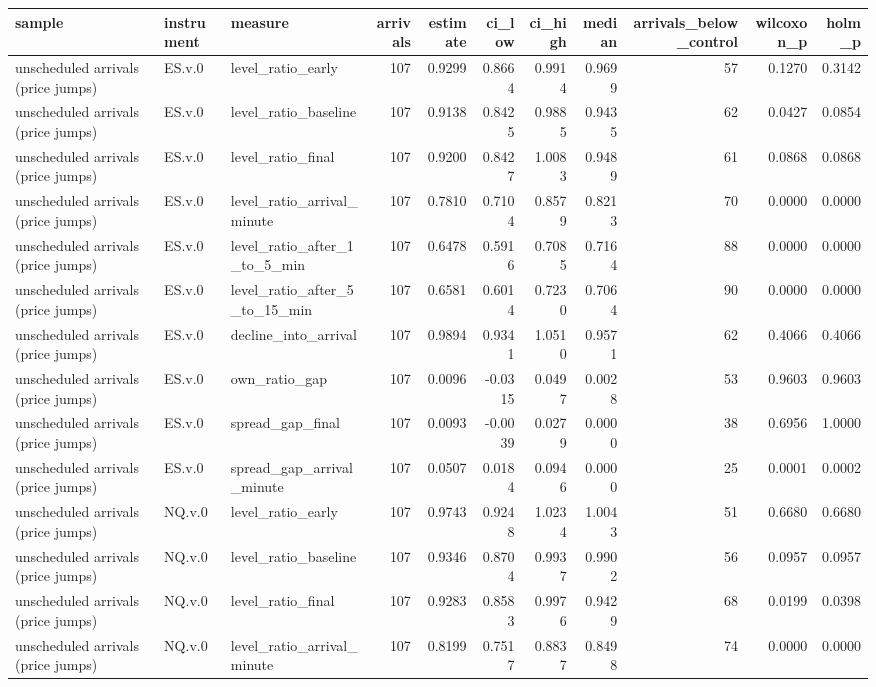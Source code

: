 \begin{tabular}{lllrrrrrrrr}
\toprule
sample & instrument & measure & arrivals & estimate & ci_low & ci_high & median & arrivals_below_control & wilcoxon_p & holm_p \\
\midrule
unscheduled arrivals (price jumps) & ES.v.0 & level_ratio_early & 107 & 0.9299 & 0.8664 & 0.9914 & 0.9699 & 57 & 0.1270 & 0.3142 \\
unscheduled arrivals (price jumps) & ES.v.0 & level_ratio_baseline & 107 & 0.9138 & 0.8425 & 0.9885 & 0.9435 & 62 & 0.0427 & 0.0854 \\
unscheduled arrivals (price jumps) & ES.v.0 & level_ratio_final & 107 & 0.9200 & 0.8427 & 1.0083 & 0.9489 & 61 & 0.0868 & 0.0868 \\
unscheduled arrivals (price jumps) & ES.v.0 & level_ratio_arrival_minute & 107 & 0.7810 & 0.7104 & 0.8579 & 0.8213 & 70 & 0.0000 & 0.0000 \\
unscheduled arrivals (price jumps) & ES.v.0 & level_ratio_after_1_to_5_min & 107 & 0.6478 & 0.5916 & 0.7085 & 0.7164 & 88 & 0.0000 & 0.0000 \\
unscheduled arrivals (price jumps) & ES.v.0 & level_ratio_after_5_to_15_min & 107 & 0.6581 & 0.6014 & 0.7230 & 0.7064 & 90 & 0.0000 & 0.0000 \\
unscheduled arrivals (price jumps) & ES.v.0 & decline_into_arrival & 107 & 0.9894 & 0.9341 & 1.0510 & 0.9571 & 62 & 0.4066 & 0.4066 \\
unscheduled arrivals (price jumps) & ES.v.0 & own_ratio_gap & 107 & 0.0096 & -0.0315 & 0.0497 & 0.0028 & 53 & 0.9603 & 0.9603 \\
unscheduled arrivals (price jumps) & ES.v.0 & spread_gap_final & 107 & 0.0093 & -0.0039 & 0.0279 & 0.0000 & 38 & 0.6956 & 1.0000 \\
unscheduled arrivals (price jumps) & ES.v.0 & spread_gap_arrival_minute & 107 & 0.0507 & 0.0184 & 0.0946 & 0.0000 & 25 & 0.0001 & 0.0002 \\
unscheduled arrivals (price jumps) & NQ.v.0 & level_ratio_early & 107 & 0.9743 & 0.9248 & 1.0234 & 1.0043 & 51 & 0.6680 & 0.6680 \\
unscheduled arrivals (price jumps) & NQ.v.0 & level_ratio_baseline & 107 & 0.9346 & 0.8704 & 0.9937 & 0.9902 & 56 & 0.0957 & 0.0957 \\
unscheduled arrivals (price jumps) & NQ.v.0 & level_ratio_final & 107 & 0.9283 & 0.8583 & 0.9976 & 0.9429 & 68 & 0.0199 & 0.0398 \\
unscheduled arrivals (price jumps) & NQ.v.0 & level_ratio_arrival_minute & 107 & 0.8199 & 0.7517 & 0.8837 & 0.8498 & 74 & 0.0000 & 0.0000 \\

\end{tabular}
